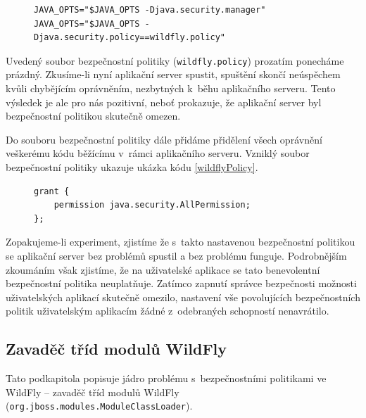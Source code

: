\begin{figure}[tbh]
\begin{lstlisting}[caption=Doplnění spouštěcího skriptu o~použití správce bezpečnosti, label=wildflySeSMcode]
JAVA_OPTS="$JAVA_OPTS -Djava.security.manager"
JAVA_OPTS="$JAVA_OPTS -Djava.security.policy==wildfly.policy"
\end{lstlisting}
\end{figure}

Uvedený soubor bezpečnostní politiky ({\tt wildfly.policy}) prozatím ponecháme prázdný.
Zkusíme-li nyní aplikační server spustit, spuštění skončí neúspěchem kvůli chybějícím oprávněním, nezbytných k~běhu aplikačního serveru. Tento výsledek je ale pro nás pozitivní, neboť prokazuje, že aplikační server byl bezpečnostní politikou skutečně omezen.

Do souboru bezpečnostní politiky dále přidáme přidělení všech oprávnění veškerému kódu běžícímu v~rámci aplikačního serveru. Vzniklý soubor bezpečnostní politiky ukazuje ukázka kódu \ref{wildflyPolicy}.

\begin{figure}[tbh]
\begin{lstlisting}[caption=První testovací soubor bezpečnostní politiky, label=wildflyPolicy]
grant {
    permission java.security.AllPermission;
};
\end{lstlisting}
\end{figure}

Zopakujeme-li experiment, zjistíme že s~takto nastavenou bezpečnostní politikou se aplikační server bez problémů spustil a bez problému funguje.
Podrobnějším zkoumáním však zjistíme, že na uživatelské aplikace se tato benevolentní bezpečnostní politika neuplatňuje.
Zatímco zapnutí správce bezpečnosti možnosti uživatelských aplikací skutečně omezilo, nastavení vše povolujících bezpečnostních politik uživatelským
aplikacím žádné z~odebraných schopností nenavrátilo.

\subsection{Zavaděč tříd modulů WildFly} \label{moduleClassLoader}

Tato podkapitola popisuje jádro problému s~bezpečnostními politikami ve WildFly -- zavaděč tříd modulů WildFly ({\tt org.jboss.modules.ModuleClassLoader}).

